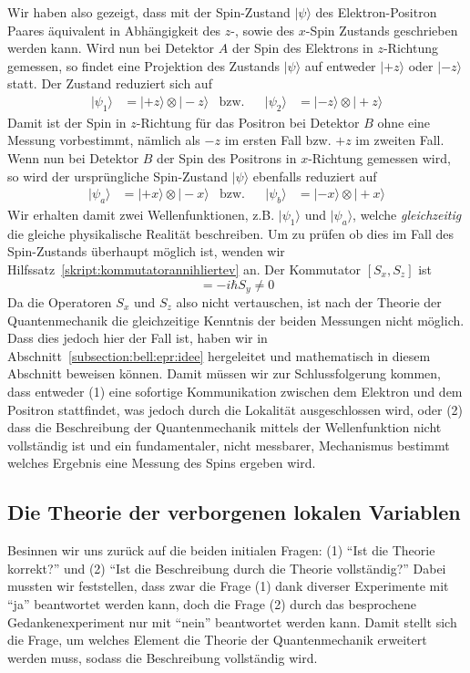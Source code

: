 \begin{refsection}
Wir haben also gezeigt, dass mit der Spin-Zustand $|\psi\rangle$ des
Elektron-Positron Paares \"aquivalent in Abh\"angigkeit des $z$-, sowie
des $x$-Spin Zustands geschrieben werden kann.
Wird nun bei Detektor $A$ der Spin des Elektrons in $z$-Richtung gemessen, 
so findet eine Projektion des Zustands $|\psi\rangle$ auf entweder
$|{+}z\rangle$ oder $|{-}z\rangle$ statt.
Der Zustand reduziert sich auf
\begin{align*}
    |\psi_{1}\rangle &= |{+}z\rangle \otimes |{-}z\rangle
    & \text{bzw.} && 
    |\psi_{2}\rangle &= |{-}z\rangle \otimes |{+}z\rangle
\end{align*}
Damit ist der Spin in $z$-Richtung f\"ur das Positron bei Detektor $B$ ohne
eine Messung vorbestimmt, n\"amlich als $-z$ im ersten Fall bzw. $+z$ im
zweiten Fall.
Wenn nun bei Detektor $B$ der Spin des Positrons in $x$-Richtung gemessen
wird, so wird der urspr\"ungliche Spin-Zustand $|\psi\rangle$
ebenfalls reduziert auf
\begin{align*}
    |\psi_{a}\rangle &= |{+}x\rangle \otimes |{-}x\rangle
    & \text{bzw.} && 
    |\psi_{b}\rangle &= |{-}x\rangle \otimes |{+}x\rangle
\end{align*}
Wir erhalten damit zwei Wellenfunktionen, z.B. $|\psi_{1}\rangle$ und 
$|\psi_{a}\rangle$, welche \emph{gleichzeitig} die gleiche 
physikalische Realit\"at beschreiben.
Um zu pr\"ufen ob dies im Fall des Spin-Zustands \"uberhaupt m\"oglich 
ist, wenden wir Hilfssatz~\ref{skript:kommutatorannihliertev} an.
Der Kommutator $[S_x,S_z]$ ist
\begin{equation}
    [S_x, S_z] =  -i \hbar S_y \neq 0
\end{equation}
Da die Operatoren $S_x$ und $S_z$ also nicht vertauschen, ist nach der Theorie
der Quantenmechanik die gleichzeitige Kenntnis der beiden Messungen nicht
m\"oglich.
Dass dies jedoch hier der Fall ist, haben wir in Abschnitt~\ref{subsection:bell:epr:idee}
hergeleitet und mathematisch in diesem Abschnitt beweisen k\"onnen.
Damit m\"ussen wir zur Schlussfolgerung kommen, dass entweder 
(1) eine sofortige Kommunikation zwischen dem Elektron und dem Positron
stattfindet, was  jedoch durch die Lokalit\"at ausgeschlossen wird,
oder (2) dass die Beschreibung der Quantenmechanik mittels der Wellenfunktion
nicht  vollst\"andig ist und ein fundamentaler, nicht messbarer, Mechanismus
bestimmt welches Ergebnis eine Messung des Spins ergeben wird.


\subsection{Die Theorie der verborgenen lokalen Variablen}
Besinnen wir uns zur\"uck auf die beiden initialen Fragen: 
(1) \enquote{Ist die Theorie korrekt?} und 
(2) \enquote{Ist die Beschreibung durch die Theorie vollst\"andig?}
Dabei mussten wir feststellen, dass zwar die Frage (1) dank diverser
Experimente mit \enquote{ja} beantwortet werden kann, doch die Frage (2) 
durch das besprochene Gedankenexperiment nur mit \enquote{nein} beantwortet
werden kann. 
Damit stellt sich die Frage, um welches Element die Theorie der Quantenmechanik
erweitert werden muss, sodass die Beschreibung vollst\"andig wird.


\end{refsection}
